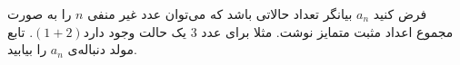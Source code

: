     \p 
فرض کنید
$a_n$
بیانگر تعداد حالاتی باشد که می‌توان عدد غیر منفی
$n$
را به صورت مجموع اعداد مثبت متمایز نوشت. مثلا برای عدد
$3$
یک حالت وجود دارد$(1 + 2)$.
تابع مولد دنباله‌ی
$a_n$
را بیابید.